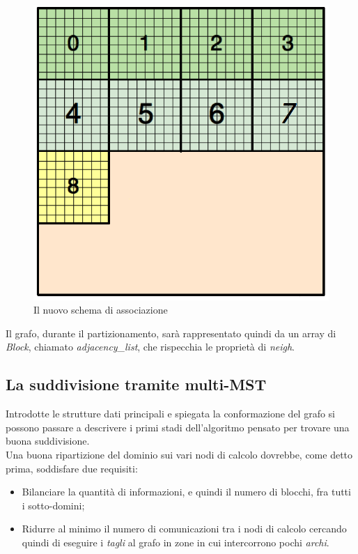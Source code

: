 \begin{figure}[H]
	\centering
	\includegraphics[width=1.0\textwidth]{immagini/block_on_grid.png}
	\caption{Il nuovo schema di associazione}
	\label{fig:new_scheme_neigh}
\end{figure}

Il grafo, durante il partizionamento, sarà rappresentato quindi da un array di \textit{Block}, chiamato \emph{adjacency\_list}, che rispecchia le proprietà di \textit{neigh}.

\subsection{La suddivisione tramite multi-MST}
Introdotte le strutture dati principali e spiegata la conformazione del grafo si possono passare a descrivere i primi stadi dell'algoritmo pensato per trovare una buona suddivisione.\\
Una buona ripartizione del dominio sui vari nodi di calcolo dovrebbe, come detto prima, soddisfare due requisiti:
\begin{itemize}
	\item Bilanciare la quantità di informazioni, e quindi il numero di blocchi, fra tutti i sotto-domini;
	\item Ridurre al minimo il numero di comunicazioni tra i nodi di calcolo cercando quindi di eseguire i \textit{tagli} al grafo in zone in cui intercorrono pochi \textit{archi}.
\end{itemize}

